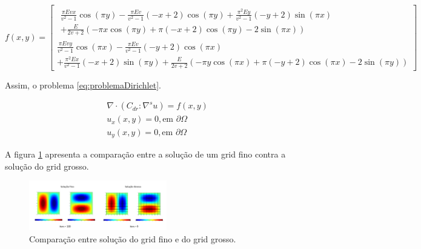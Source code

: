 \begin{equation}\label{eq:ldDiricheletHomogeneo}
f(x, y) = 
\left[\begin{matrix}
\begin{split}
\frac{\pi E v x}{v^{2} - 1} \cos{\left (\pi y \right )} - \frac{\pi E v}{v^{2} - 1} \left(- x + 2\right) \cos{\left (\pi y \right )} + \frac{\pi^{2} E y}{v^{2} - 1} \left(- y + 2\right) \sin{\left (\pi x \right )} 
\\
+
\frac{E}{2 v + 2} \left(- \pi x \cos{\left (\pi y \right )} + \pi \left(- x + 2\right) \cos{\left (\pi y \right )} - 2 \sin{\left (\pi x \right )}\right)
\end{split}
\\

\frac{\pi E v y}{v^{2} - 1} \cos{\left (\pi x \right )} - \frac{\pi E v}{v^{2} - 1} \left(- y + 2\right) \cos{\left (\pi x \right )} 
\\
+ \frac{\pi^{2} E x}{v^{2} - 1} \left(- x + 2\right) \sin{\left (\pi y \right )} + \frac{E}{2 v + 2} \left(- \pi y \cos{\left (\pi x \right )} + \pi \left(- y + 2\right) \cos{\left (\pi x \right )} - 2 \sin{\left (\pi y \right )}\right)\end{matrix}\right]
\end{equation}


Assim, o problema \ref{eq:problemaDirichlet}.

\begin{equation} \label{eq:problemaDirichlet}
\begin{matrix}
\nabla \cdot  (C_{dr} : \nabla ^s u) = f(x,y)
\\ 
u_x (x, y)  =  0, \text{em } \partial \Omega
\\ 
u_y (x, y)  =  0, \text{em } \partial \Omega

\end{matrix}
\end{equation}

A figura \ref{fig:DirichletHomogeneo} apresenta a comparação entre a solução de um grid fino contra a solução do grid grosso.  

\begin{figure}[!htbp]
\label{fig:DirichletHomogeneo}
\centering
\includegraphics[width=6cm]{chap08/figs/DirichletHomogeneoTemp.png}
\caption{Comparação entre solução do grid fino e do grid grosso. }
\end{figure}


